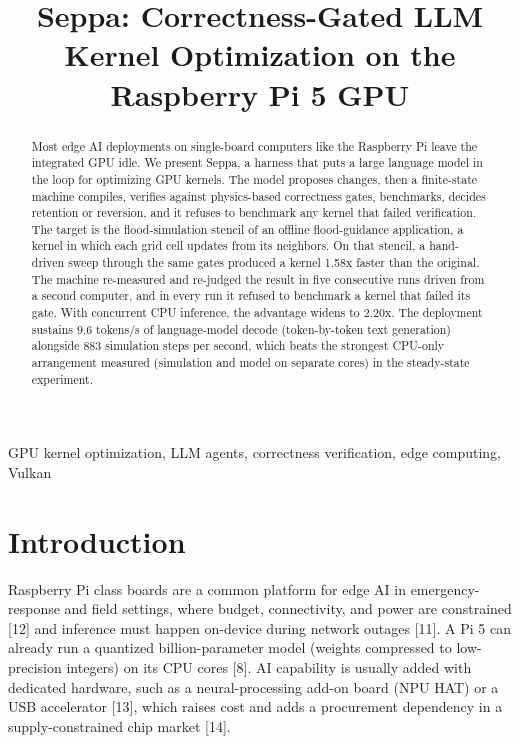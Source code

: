 \documentclass[conference]{IEEEtran}
\begin{document}
\title{Seppa: Correctness-Gated LLM Kernel Optimization on the Raspberry Pi 5 GPU}
\author{
}
\maketitle
\begin{abstract}
Most edge AI deployments on single-board computers like the Raspberry Pi
leave the integrated GPU idle. We present Seppa, a harness that puts a
large language model in the loop for optimizing GPU kernels. The model
proposes changes, then a finite-state machine compiles, verifies against
physics-based correctness gates, benchmarks, decides retention or
reversion, and it refuses to benchmark any kernel that failed
verification. The target is the flood-simulation stencil of an offline
flood-guidance application, a kernel in which each grid cell updates
from its neighbors. On that stencil, a hand-driven sweep through the
same gates produced a kernel 1.58x faster than the original. The machine
re-measured and re-judged the result in five consecutive runs driven
from a second computer, and in every run it refused to benchmark a
kernel that failed its gate. With concurrent CPU inference, the
advantage widens to 2.20x. The deployment sustains 9.6 tokens/s of
language-model decode (token-by-token text generation) alongside 883
simulation steps per second, which beats the strongest CPU-only
arrangement measured (simulation and model on separate cores) in the
steady-state experiment.
\end{abstract}
\begin{IEEEkeywords}
GPU kernel optimization, LLM agents, correctness verification, edge computing, Vulkan
\end{IEEEkeywords}
\section{Introduction}\label{introduction}

Raspberry Pi class boards are a common platform for edge AI in
emergency-response and field settings, where budget, connectivity, and
power are constrained {[}12{]} and inference must happen on-device
during network outages {[}11{]}. A Pi 5 can already run a quantized
billion-parameter model (weights compressed to low-precision integers)
on its CPU cores {[}8{]}. AI capability is usually added with dedicated
hardware, such as a neural-processing add-on board (NPU HAT) or a USB
accelerator {[}13{]}, which raises cost and adds a procurement
dependency in a supply-constrained chip market {[}14{]}.
\end{document}
